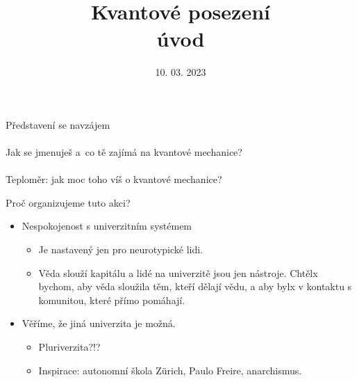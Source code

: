 \documentclass[11pt,t]{beamer}
\title{\color{black}%
\Huge
Kvantové posezení\\
úvod
}
\date{10. 03. 2023}
\newenvironment{slidecontent}
	{\vspace*{\fill}
	}
	{
	\vspace*{\fill}
}
\newenvironment{slidetitle}
	{\vspace*{0.5cm}\hspace*{.2cm}\Huge
	}
	{
	\vspace*{0.6cm}
}
\begin{document}
{
\begin{frame}[plain]
\begin{slidetitle}
\end{slidetitle}
\begin{slidecontent}
\maketitle
\end{slidecontent}
\end{frame}
}


{
\begin{frame}[plain]
\begin{slidetitle}
\end{slidetitle}
\begin{slidecontent}
\centering
\Huge
\vfill
Představení se navzájem\\
\phantom{.}\\
\Large
Jak se jmenuješ a~co tě zajímá na kvantové mechanice?
\\
\phantom{.}\\
\pause
Teploměr: jak moc toho víš o kvantové mechanice?
\vfill
\end{slidecontent}
\end{frame}
}

{
\begin{frame}[plain]
\begin{slidetitle}
Proč organizujeme tuto akci?
\end{slidetitle}
\begin{slidecontent}
\begin{itemize}
\item Nespokojenost s univerzitním systémem
\begin{itemize}
\item Je nastavený jen pro neurotypické lidi.
\item Věda slouží kapitálu a lidé na univerzitě jsou jen nástroje. Chtělx
bychom, aby věda sloužila těm, kteří dělají vědu, a aby bylx v kontaktu s
komunitou, které přímo pomáhají.
\pause
\end{itemize}
\item Věříme, že jiná univerzita je možná.
\begin{itemize}
\item Pluriverzita?!?
\item Inspirace: autonomní škola Zürich, Paulo Freire, anarchismus.
\end{itemize}
\end{itemize}
\end{slidecontent}
\end{frame}
}
\end{document}
